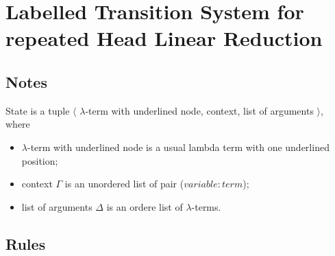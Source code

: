 \documentclass[a4paper, 10pt]{article}
\begin{document}
\section{Labelled Transition System for repeated Head Linear Reduction}

\subsection{Notes}
State is a tuple $\langle$ $\lambda$-term with underlined node, context, list of arguments $\rangle$, where
\begin{itemize}
\item $\lambda$-term with underlined node is a usual lambda term with one underlined position;
\item context $\Gamma$ is an unordered list of pair ($variable : term$);
\item list of arguments $\Delta$ is an ordere list of $\lambda$-terms.
\end{itemize}


\subsection{Rules}
\end{document}
